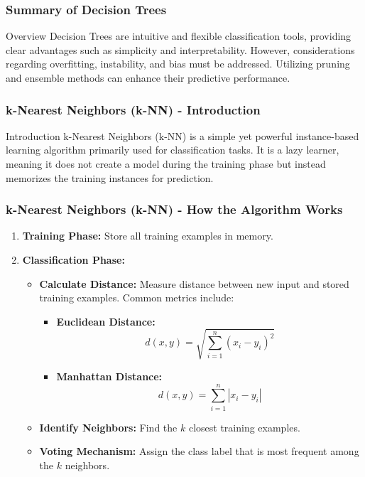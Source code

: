 \documentclass[aspectratio=169]{beamer}
\begin{document}
\begin{frame}[fragile]
    \frametitle{Summary of Decision Trees}
    \begin{block}{Overview}
        Decision Trees are intuitive and flexible classification tools, providing clear advantages such as simplicity and interpretability. However, considerations regarding overfitting, instability, and bias must be addressed. Utilizing pruning and ensemble methods can enhance their predictive performance.
    \end{block}
\end{frame}

\begin{frame}[fragile]
    \frametitle{k-Nearest Neighbors (k-NN) - Introduction}
    \begin{block}{Introduction}
        k-Nearest Neighbors (k-NN) is a simple yet powerful instance-based learning algorithm primarily used for classification tasks. 
        It is a lazy learner, meaning it does not create a model during the training phase but instead memorizes the training instances for prediction.
    \end{block}
\end{frame}

\begin{frame}[fragile]
    \frametitle{k-Nearest Neighbors (k-NN) - How the Algorithm Works}
    \begin{enumerate}
        \item \textbf{Training Phase:} Store all training examples in memory.
        \item \textbf{Classification Phase:}
        \begin{itemize}
            \item \textbf{Calculate Distance:} Measure distance between new input and stored training examples. Common metrics include:
            \begin{itemize}
                \item \textbf{Euclidean Distance:}
                \begin{equation}
                    d(x, y) = \sqrt{\sum_{i=1}^{n} (x_i - y_i)^2}
                \end{equation}
                \item \textbf{Manhattan Distance:}
                \begin{equation}
                    d(x, y) = \sum_{i=1}^{n} |x_i - y_i|
                \end{equation}
            \end{itemize}
            \item \textbf{Identify Neighbors:} Find the $k$ closest training examples.
            \item \textbf{Voting Mechanism:} Assign the class label that is most frequent among the $k$ neighbors.
        \end{itemize}
    \end{enumerate}
\end{frame}
\end{document}

